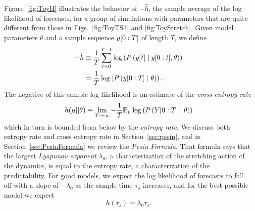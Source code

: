 Figure~\ref{fig:ToyH} illustrates the behavior of $-\hat h$, the
 sample average of the log likelihood of forecasts, for a group of simulations with parameters that are quite different from those in Figs.~\ref{fig:ToyTS1} and \ref{fig:ToyStretch}.  Given model parameters $\theta$ and a sample sequence $y[0:T]$ of length $T$, we define \begin{align*} -\hat h &\equiv \frac{1}{T} \sum_{t=0}^{T-1} \log \left( P \left({y}{[t]}\mid y[0:t], \theta
      \right)\right)\\
    &=  \frac{1}{T} \log \left( P \left(y[0:T]\mid  \theta
      \right)\right).
\end{align*}
The negative of this sample log likelihood is an estimate of the
\emph{cross entropy rate} 
\begin{equation*}
  h(\mu||\theta) \equiv  \lim_{T \rightarrow \infty} - \frac{1}{T}
  \mathbb{E}_{\mu} \log \left( P \left(Y[0:T]\mid \theta \right) \right)
\end{equation*}
which in turn is bounded from below by the \emph{entropy rate}.  We
discuss both entropy rate and cross entropy rate in
Section~\ref{sec:pesin}, and in Section~\ref{sec:PesinFormula} we
review the \emph{Pesin Formula}.  That formula says that the largest
\emph{Lyapunov exponent} $\lambda_0$, a characterization of the
stretching action of the dynamics, is equal to the entropy rate, a
characterization of the predictability.  For good models, we expect
the log likelihood of forecasts to fall off with a slope of
$-\lambda_0$ as the sample time $\tau_s$ increases, and for the best
possible model we expect
\begin{equation}
  \label{eq:bound1}
  h(\tau_s) = \lambda_0 \tau_s.
\end{equation}

